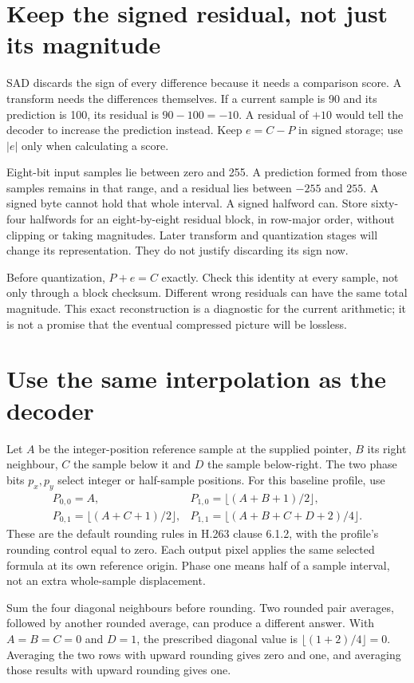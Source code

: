 \section{Keep the signed residual, not just its magnitude}
SAD discards the sign of every difference because it needs a comparison score.
A transform needs the differences themselves. If a current sample is 90 and its
prediction is 100, its residual is $90-100=-10$. A residual of $+10$ would tell
the decoder to increase the prediction instead. Keep $e=C-P$ in signed storage;
use $|e|$ only when calculating a score.

Eight-bit input samples lie between zero and 255. A prediction formed from those
samples remains in that range, and a residual lies between $-255$ and $255$.
A signed byte cannot hold that whole interval. A signed halfword can. Store
sixty-four halfwords for an eight-by-eight residual block, in row-major order,
without clipping or taking magnitudes. Later transform and quantization stages
will change its representation. They do not justify discarding its sign now.

Before quantization, $P+e=C$ exactly. Check this identity at every sample, not
only through a block checksum. Different wrong residuals can have the same total
magnitude. This exact reconstruction is a diagnostic for the current arithmetic;
it is not a promise that the eventual compressed picture will be lossless.

\section{Use the same interpolation as the decoder}
Let $A$ be the integer-position reference sample at the supplied pointer, $B$
its right neighbour, $C$ the sample below it and $D$ the sample below-right.
The two phase bits $p_x,p_y$ select integer or half-sample positions. For this
baseline profile, use
\[
  \begin{array}{ll}
    P_{0,0}=A,                       & P_{1,0}=\lfloor(A+B+1)/2\rfloor, \\[3pt]
    P_{0,1}=\lfloor(A+C+1)/2\rfloor, &
    P_{1,1}=\lfloor(A+B+C+D+2)/4\rfloor.
  \end{array}
\]
These are the default rounding rules in H.263 clause 6.1.2, with the profile's
rounding control equal to zero. Each output pixel applies the same selected
formula at its own reference origin. Phase one means half of a sample interval,
not an extra whole-sample displacement.

Sum the four diagonal neighbours before rounding. Two rounded pair averages,
followed by another rounded average, can produce a different answer. With
$A=B=C=0$ and $D=1$, the prescribed diagonal value is
$\lfloor(1+2)/4\rfloor=0$. Averaging the two rows with upward rounding gives zero
and one, and averaging those results with upward rounding gives one.

